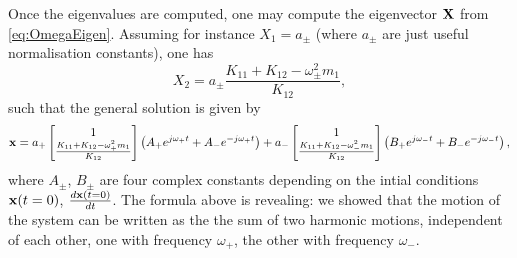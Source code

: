 Once the eigenvalues are computed, one may compute the eigenvector $ {\bf X}$ from \eqref{eq:OmegaEigen}. Assuming for instance $ { X}_1 = a_{\pm}$ (where $a_\pm$ are just useful normalisation constants), one has
\begin{equation}
 X_2 = a_{\pm}\frac{K_{11} + K_{12} - \omega^2_\pm m_1}{K_{12}},
\end{equation}
such that the general solution is given by
\begin{equation}
{\bf x} = a_+\begin{bmatrix} 1 \\ \frac{K_{11} + K_{12} - \omega^2_+ m_1}{K_{12}}\end{bmatrix}\left(A_+ e^{j\omega_+ t} + A_- e^{- j\omega_+ t} \right) + a_-\begin{bmatrix} 1 \\ \frac{K_{11} + K_{12} - \omega^2_- m_1}{K_{12}}\end{bmatrix}\left(B_+ e^{j\omega_- t} + B_- e^{- j\omega_- t} \right),
\end{equation}
where $A_\pm$, $B_\pm$ are four complex constants depending on the intial conditions ${\bf x}(t=0)$, $\frac{d{\bf x}(t=0) }{dt}$. The formula above is revealing: we showed that the motion of the system can be written as the the sum of two harmonic motions, independent of each other, one with frequency $\omega_+$, the other with frequency $\omega_-$. 






